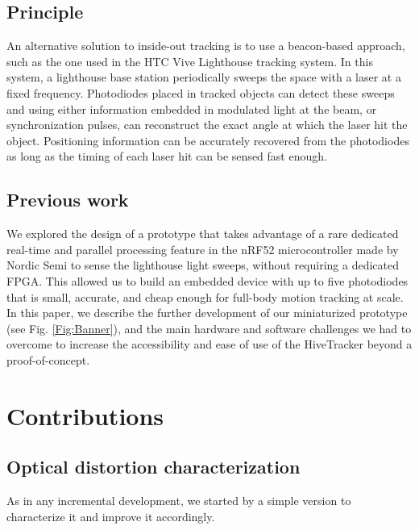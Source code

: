 \documentclass[sigchi]{acmart}
\begin{document}
\subsection{Principle}
An alternative solution to inside-out tracking is to use a beacon-based approach, such as the one used in the HTC Vive Lighthouse tracking system. In this system, a lighthouse base station periodically sweeps the space with a laser at a fixed frequency. Photodiodes placed in tracked objects can detect these sweeps and using either information embedded in modulated light at the beam, or synchronization pulses, can reconstruct the exact angle at which the laser hit the object. Positioning information can be accurately recovered from the photodiodes as long as the timing of each laser hit can be sensed fast enough.


\subsection{Previous work}
We explored the design of a prototype\cite{Quinones2018} that takes advantage of a rare dedicated real-time and parallel processing feature in the nRF52 microcontroller made by Nordic Semi to sense the lighthouse light sweeps, without requiring a dedicated FPGA. This allowed us to build an embedded device with up to five photodiodes that is small, accurate, and cheap enough for full-body motion tracking at scale.
\newline \newline
In this paper, we describe the further development of our miniaturized prototype (see Fig. \ref{Fig:Banner}), and the main hardware and software challenges we had to overcome to increase the accessibility and ease of use of the HiveTracker beyond a proof-of-concept.

\section{Contributions}


\subsection{Optical distortion characterization}

As in any incremental development, we started by a simple version to characterize it and improve it accordingly.
\end{document}
